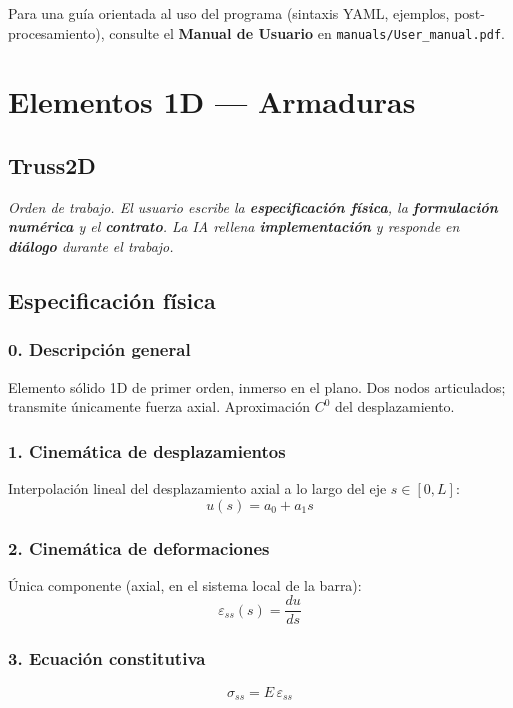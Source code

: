 \documentclass[11pt,letterpaper,oneside]{report}
\begin{document}
Para una guía orientada al uso del programa (sintaxis YAML, ejemplos, post-procesamiento), consulte el \textbf{Manual de Usuario} en \texttt{manuals/User\_manual.pdf}.

\newpage
{}
\setcounter{page}{1}


\chapter{Elementos 1D — Armaduras}

\section{Truss2D}



\textit{Orden de trabajo. El usuario escribe la \textbf{especificación física}, la \textbf{formulación numérica} y el \textbf{contrato}. La IA rellena \textbf{implementación} y responde en \textbf{diálogo} durante el trabajo.}



\section{Especificación física}

\subsection{0. Descripción general}
Elemento sólido 1D de primer orden, inmerso en el plano. Dos nodos articulados; transmite únicamente fuerza axial. Aproximación $C^0$ del desplazamiento.

\subsection{1. Cinemática de desplazamientos}
Interpolación lineal del desplazamiento axial a lo largo del eje $s \in [0, L]$:
\[
u(s) = a_0 + a_1 s
\]

\subsection{2. Cinemática de deformaciones}
Única componente (axial, en el sistema local de la barra):
\[
\varepsilon_{ss}(s) = \frac{du}{ds}
\]

\subsection{3. Ecuación constitutiva}
\[
\sigma_{ss} = E\, \varepsilon_{ss}
\]
\end{document}
